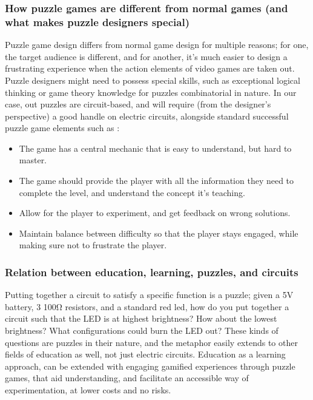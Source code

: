 \documentclass[../main.tex]{subfiles}
\begin{document}
\subsubsection{How puzzle games are different from normal games (and what makes puzzle designers special)}
Puzzle game design differs from normal game design for multiple reasons; for one, the target audience is different, and for another, it’s much easier to design a frustrating experience when the action elements of video games are taken out. Puzzle designers might need to possess special skills, such as exceptional logical thinking or game theory knowledge for puzzles combinatorial in nature. In our case, out puzzles are circuit-based, and will require (from the designer’s perspective) a good handle on electric circuits, alongside standard successful puzzle game elements such as \cite{16}:
\begin{itemize}
    \item The game has a central mechanic that is easy to understand, but hard to master.
    \item The game should provide the player with all the information they need to complete the level, and understand the concept it’s teaching.
    \item Allow for the player to experiment, and get feedback on wrong solutions.
    \item Maintain balance between difficulty so that the player stays engaged, while making sure not to frustrate the player.
\end{itemize}

\subsubsection{Relation between education, learning,  puzzles, and circuits}
Putting together a circuit to satisfy a specific function is a puzzle; given a 5V battery, 3 100Ω resistors, and a standard red \acrshort{led}, how do you put together a circuit such that the LED is at highest brightness? How about the lowest brightness? What configurations could burn the LED out? These kinds of questions are puzzles in their nature, and the metaphor easily extends to other fields of education as well, not just electric circuits. Education as a learning approach, can be extended with engaging gamified experiences through puzzle games, that aid understanding, and facilitate an accessible way of experimentation, at lower costs and no risks.
\end{document}
